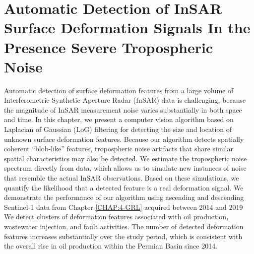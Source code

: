 
\chapter{Automatic Detection of InSAR Surface Deformation Signals In the Presence Severe Tropospheric Noise}
\label{CHAP:6-blob}

Automatic detection of surface deformation features from a large volume of Interferometric Synthetic Aperture Radar (InSAR) data is challenging, because the magnitude of InSAR measurement noise varies substantially in both space and time. In this chapter, we present a computer vision algorithm based on Laplacian of Gaussian (LoG) filtering for detecting the size and location of unknown surface deformation features. Because our algorithm detects spatially coherent ``blob-like'' features, tropospheric noise artifacts that share similar spatial characteristics may also be detected. We estimate the tropospheric noise spectrum directly from data, which allows us to simulate new instances of noise that resemble the actual InSAR observations. Based on these simulations, we quantify the likelihood that a detected feature is a real deformation signal. We demonstrate the performance of our algorithm using 
ascending and descending Sentinel-1 data from Chapter \ref{CHAP:4-GRL} acquired between 2014 and 2019
We detect clusters of deformation features associated with oil production, wastewater injection, and fault activities. The number of detected deformation features increases substantially over the study period, which is consistent with the overall rise in oil production within the Permian Basin since 2014. 




